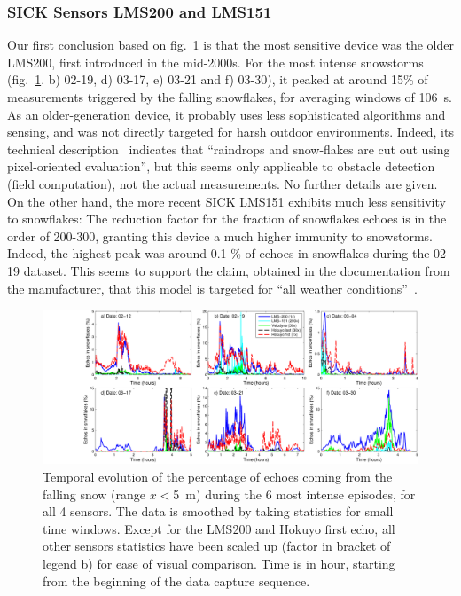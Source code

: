 \subsubsection{SICK Sensors LMS200 and LMS151}
Our first conclusion based on fig.~\ref{fig:TimingSnow} is that the most sensitive device was the older LMS200, first introduced in the mid-2000s. For the most intense snowstorms (fig.~\ref{fig:TimingSnow}. b) 02-19, d) 03-17, e) 03-21 and f) 03-30), it peaked at around 15\% of measurements triggered by the falling snowflakes, for averaging windows of \SI{106}{\second}. As an older-generation device, it probably uses less sophisticated algorithms and sensing, and was not directly targeted for harsh outdoor environments. Indeed, its technical description~\cite{LMS200Manual} indicates that ``raindrops and snow-flakes are cut out using pixel-oriented evaluation'', but this seems only applicable to obstacle detection (field computation), not the actual measurements. No further details are given. On the other hand, the more recent SICK LMS151 exhibits much less sensitivity to snowflakes: The reduction factor for the fraction of snowflakes echoes is in the order of 200-300, granting this device a much higher immunity to snowstorms. Indeed, the highest peak was around 0.1 \% of echoes in snowflakes during the 02-19 dataset. This seems to support the claim, obtained in the documentation from the manufacturer, that this model is targeted for ``all weather conditions''~\cite{LMS151Manual}.


\begin{figure}[th]
    \centering
    \includegraphics[trim={3.2cm 0 0 0},clip,width=0.97\linewidth]{./img/Timings.pdf}
    \caption{Temporal evolution of the percentage of echoes coming from the falling snow (range $x<$\SI{5}{\meter}) during the 6 most intense episodes, for all 4 sensors. The data is smoothed by taking statistics for small time windows. Except for the LMS200 and Hokuyo first echo, all other sensors statistics have been scaled up (factor in bracket of legend b) for ease of visual comparison. Time is in hour, starting from the beginning of the data capture sequence.}
    \label{fig:TimingSnow}
\end{figure}


